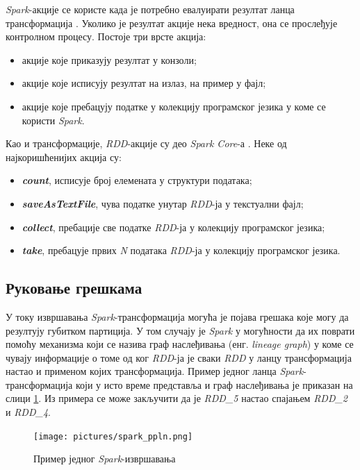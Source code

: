 \documentclass[12pt,oneside]{memoir}
\begin{document}
\textit{Spark}-акције се користе када је потребно евалуирати резултат ланца трансформација \cite{spark_guide}. Уколико је резултат акције нека вредност, она се прослеђује контролном процесу. Постоје три врсте акција:

\begin{itemize}
\item акције које приказују резултат у конзоли;
\item акције које исписују резултат на излаз, на пример у фајл;
\item акције које пребацују податке у колекцију програмског језика у коме се користи \textit{Spark}.
\end{itemize}

Као и трансформације, \textit{RDD}-акције су део \textit{Spark Core}-а  \cite{spark_rdd_transf}. Неке од најкоришћенијих акција су:

\begin{itemize}
	\item \textbf{\textit{count}}, исписује број елемената у структури података;
	\item \textbf{\textit{saveAsTextFile}}, чува податке унутар \textit{RDD}-ја у текстуални фајл;
	\item \textbf{\textit{collect}}, пребације све податке \textit{RDD}-ја у колекцију програмског језика;
	\item \textbf{\textit{take}}, пребацује првих \textit{N} података \textit{RDD}-ја у колекцију програмског језика.
\end{itemize}

\subsection{Руковање грешкама}
\label{subsec:spark_dags}

У току извршавања \textit{Spark}-трансформација могућа је појава грешака које могу да резултују губитком партиција. У том случају је \textit{Spark} у могућности да их поврати помоћу механизма који се назива граф наслеђивања (енг. \textit{lineage graph}) у коме се чувају информације о томе од ког \textit{RDD}-ја је сваки \textit{RDD} у ланцу трансформација настао и применом којих трансформација. Пример једног ланца \textit{Spark}-трансформација који у исто време представља и граф наслеђивања је приказан на  слици \ref{fig:sprk_ppln}. Из примера се може закључити да је \textit{RDD\_5} настао спајањем \textit{RDD\_2} и \textit{RDD\_4}.

\begin{figure}[!ht]
  \centering
  \texttt{[image: pictures/spark\_ppln.png]}
  \caption{Пример једног \textit{Spark}-извршавања}
  \label{fig:sprk_ppln}
\end{figure}
\end{document}
